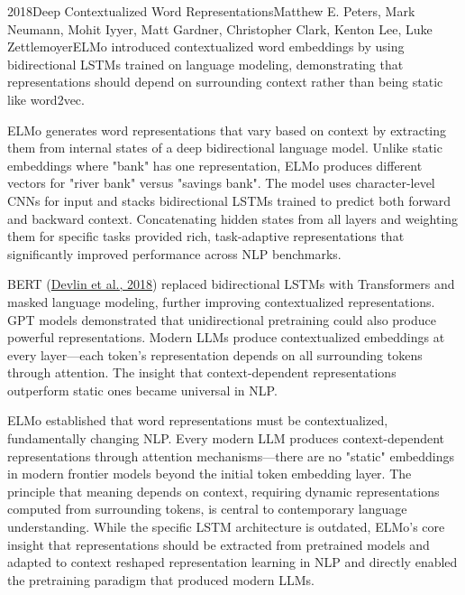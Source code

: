 
\begin{papersummary}{2018}{Deep Contextualized Word Representations}{Matthew E. Peters, Mark Neumann, Mohit Iyyer, Matt Gardner, Christopher Clark, Kenton Lee, Luke Zettlemoyer}{ELMo introduced contextualized word embeddings by using bidirectional LSTMs trained on language modeling, demonstrating that representations should depend on surrounding context rather than being static like word2vec.}

ELMo generates word representations that vary based on context by extracting them from internal states of a deep bidirectional language model. Unlike static embeddings where "bank" has one representation, ELMo produces different vectors for "river bank" versus "savings bank". The model uses character-level CNNs for input and stacks bidirectional LSTMs trained to predict both forward and backward context. Concatenating hidden states from all layers and weighting them for specific tasks provided rich, task-adaptive representations that significantly improved performance across NLP benchmarks.

BERT (\hyperref[paper:devlin-2018]{Devlin et al., 2018}) replaced bidirectional LSTMs with Transformers and masked language modeling, further improving contextualized representations. GPT models demonstrated that unidirectional pretraining could also produce powerful representations. Modern LLMs produce contextualized embeddings at every layer—each token's representation depends on all surrounding tokens through attention. The insight that context-dependent representations outperform static ones became universal in NLP.

ELMo established that word representations must be contextualized, fundamentally changing NLP. Every modern LLM produces context-dependent representations through attention mechanisms—there are no "static" embeddings in modern frontier models beyond the initial token embedding layer. The principle that meaning depends on context, requiring dynamic representations computed from surrounding tokens, is central to contemporary language understanding. While the specific LSTM architecture is outdated, ELMo's core insight that representations should be extracted from pretrained models and adapted to context reshaped representation learning in NLP and directly enabled the pretraining paradigm that produced modern LLMs.

\end{papersummary}
